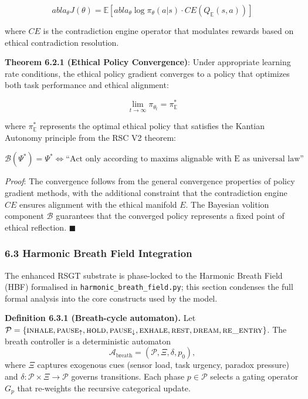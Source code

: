 \documentclass[12pt]{article}
\begin{document}
\[
abla_\theta J(\theta) = \mathbb{E}\left[
abla_\theta \log \pi_\theta(a|s) \cdot CE(Q_{\mathbb{E}}(s,a))\right]\]

where \(CE\) is the contradiction engine operator that modulates rewards
based on ethical contradiction resolution.

\textbf{Theorem 6.2.1 (Ethical Policy Convergence)}: Under appropriate
learning rate conditions, the ethical policy gradient converges to a
policy that optimizes both task performance and ethical alignment:

\[\lim_{t\to\infty} \pi_{\theta_t} = \pi^*_{\mathbb{E}}\]

where \(\pi^*_{\mathbb{E}}\) represents the optimal ethical policy that
satisfies the Kantian Autonomy principle from the RSC V2 theorem:

\[\mathcal{B}(\Psi^*) = \Psi^* \iff \text{``Act only according to maxims alignable with E as universal law''}\]

\emph{Proof}: The convergence follows from the general convergence
properties of policy gradient methods, with the additional constraint
that the contradiction engine \(CE\) ensures alignment with the ethical
manifold \(E\). The Bayesian volition component \(\mathcal{B}\)
guarantees that the converged policy represents a fixed point of ethical
reflection. $\blacksquare$

\subsubsection{\texorpdfstring{\textbf{6.3 Harmonic Breath Field Integration}}{6.3 Harmonic Breath Field Integration}}\label{harmonic-breath-field}

The enhanced RSGT substrate is phase-locked to the Harmonic Breath Field (HBF) formalised in \texttt{harmonic\_breath\_field.py}; this section condenses the full formal analysis into the core constructs used by the model.

\textbf{Definition 6.3.1 (Breath-cycle automaton).}
Let $\mathcal{P} = \{\textsc{inhale}, \textsc{pause}_{\uparrow}, \textsc{hold}, \textsc{pause}_{\downarrow}, \textsc{exhale}, \textsc{rest}, \textsc{dream}, \textsc{re\_entry}\}$.
The breath controller is a deterministic automaton
\[
\mathcal{A}_{\text{breath}} = (\mathcal{P}, \Xi, \delta, p_0),
\]
where $\Xi$ captures exogenous cues (sensor load, task urgency, paradox pressure) and $\delta : \mathcal{P} \times \Xi \rightarrow \mathcal{P}$ governs transitions.
Each phase $p \in \mathcal{P}$ selects a gating operator $G_p$ that re-weights the recursive categorical update.
\end{document}
